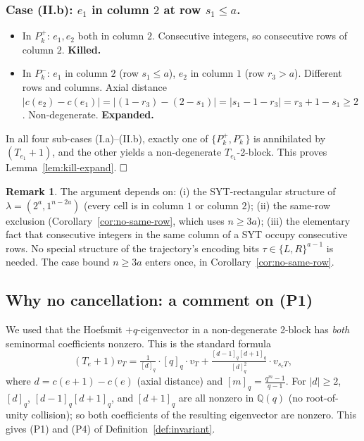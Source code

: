 \documentclass[11pt]{article}
\theoremstyle{definition}
\newtheorem{remark}[theorem]{Remark}
\begin{document}
\subsubsection*{Case (II.b): $e_1$ in column $2$ at row $s_1\le a$.}

\begin{itemize}[leftmargin=2em,topsep=0.3em,itemsep=0.2em]
\item In $P_k^+$: $e_1,e_2$ both in column $2$.  Consecutive
integers, so consecutive rows of column $2$.  \textbf{Killed.}
\item In $P_k^-$: $e_1$ in column $2$ (row $s_1\le a$), $e_2$ in
column $1$ (row $r_3>a$).  Different rows and columns.  Axial
distance $|c(e_2)-c(e_1)|=|(1-r_3)-(2-s_1)|=|s_1-1-r_3|=r_3+1-s_1\ge 2$.
Non-degenerate.  \textbf{Expanded.}
\end{itemize}

In all four sub-cases (I.a)--(II.b), exactly one of $\{P_k^+,P_k^-\}$
is annihilated by $(T_{e_1}{+}1)$, and the other yields a
non-degenerate $T_{e_1}$-2-block.  This proves
Lemma~\ref{lem:kill-expand}.  $\hfill\square$

\begin{remark}
The argument depends on:
(i) the SYT-rectangular structure of $\lambda=(2^a,1^{n-2a})$
  (every cell is in column $1$ or column $2$);
(ii) the same-row exclusion
  (Corollary~\ref{cor:no-same-row}, which uses $n\ge 3a$);
(iii) the elementary fact that consecutive integers in the same
  column of a SYT occupy consecutive rows.
No special structure of the trajectory's encoding bits
$\tau\in\{L,R\}^{a-1}$ is needed.  The case bound $n\ge 3a$ enters
once, in Corollary~\ref{cor:no-same-row}.
\end{remark}

\subsection{Why no cancellation: a comment on (P1)}\label{sec:nonzero}

We used that the Hoefsmit $+q$-eigenvector in a non-degenerate
2-block has \emph{both} seminormal coefficients nonzero.  This is the
standard formula
\[
   (T_e+1)v_T=\tfrac{1}{[d]_q}\cdot[q]_q\cdot v_T+\tfrac{[d{-}1]_q[d{+}1]_q}{[d]_q^2}\cdot v_{s_eT},
\]
where $d=c(e+1)-c(e)$ (axial distance) and $[m]_q=\frac{q^m-1}{q-1}$.
For $|d|\ge 2$, $[d]_q$, $[d-1]_q[d+1]_q$, and $[d{+}1]_q$
are all nonzero in $\mathbb{Q}(q)$ (no root-of-unity collision); so
both coefficients of the resulting eigenvector are nonzero.
This gives (P1) and (P4) of Definition~\ref{def:invariant}.
\end{document}
